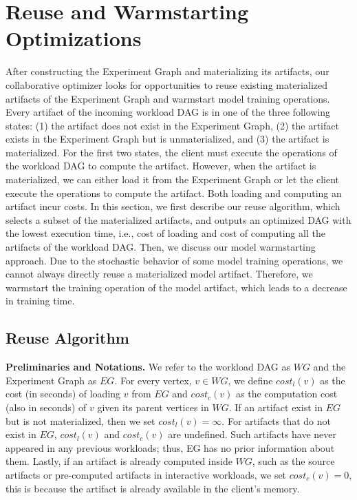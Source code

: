 \section{Reuse and Warmstarting Optimizations}\label{sec-reuse-and-warmstarting}
After constructing the Experiment Graph and materializing its artifacts, our collaborative optimizer looks for opportunities to reuse existing materialized artifacts of the Experiment Graph and warmstart model training operations.
Every artifact of the incoming workload DAG is in one of the three following states: (1) the artifact does not exist in the Experiment Graph, (2) the artifact exists in the Experiment Graph but is unmaterialized, and (3) the artifact is materialized.
For the first two states, the client must execute the operations of the workload DAG to compute the artifact.
However, when the artifact is materialized, we can either load it from the Experiment Graph or let the client execute the operations to compute the artifact.
Both loading and computing an artifact incur costs.
In this section, we first describe our reuse algorithm, which selects a subset of the materialized artifacts, and outputs an optimized DAG with the lowest execution time, i.e., cost of loading and cost of computing all the artifacts of the workload DAG.
Then, we discuss our model warmstarting approach.
Due to the stochastic behavior of some model training operations, we cannot always directly reuse a materialized model artifact.
Therefore, we warmstart the training operation of the model artifact, which leads to a decrease in training time.

\subsection{Reuse Algorithm} 
\textbf{Preliminaries and Notations.} 
We refer to the workload DAG as $WG$ and the Experiment Graph as $EG$.
For every vertex, $v \in WG$, we define $cost_l(v)$ as the cost (in seconds) of loading $v$ from $EG$ and $cost_c(v)$ as the computation cost (also in seconds) of $v$ given its parent vertices in $WG$.
If an artifact exist in $EG$ but is not materialized, then we set $cost_l(v)=\infty$.
For artifacts that do not exist in $EG$, $cost_l(v)$ and $cost_c(v)$ are undefined.
Such artifacts have never appeared in any previous workloads; thus, EG has no prior information about them.
Lastly, if an artifact is already computed inside $WG$, such as the source artifacts or pre-computed artifacts in interactive workloads, we set $cost_c(v)=0$, this is because the artifact is already available in the client's memory.

